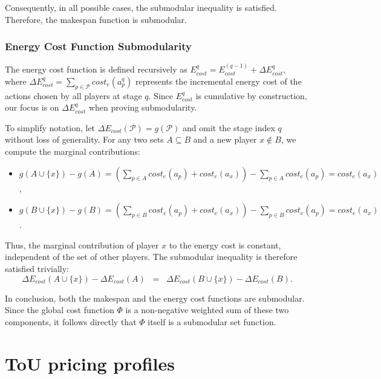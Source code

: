 \documentclass[preprint, 3p, review, 12pt]{elsarticle}
\begin{document}
Consequently, in all possible cases, the submodular inequality is satisfied. Therefore, the makespan function is submodular.

\subsubsection{Energy Cost Function Submodularity}
The energy cost function is defined recursively as $E_{cost}^{q} = E_{cost}^{(q-1)} + \Delta E_{cost}^{q}$, where $\Delta E_{cost}^{q} = \sum_{p \in \mathcal{P}} cost_e(a_p^{q})$ represents the incremental energy cost of the actions chosen by all players at stage $q$. Since $E_{cost}^{q}$ is cumulative by construction, our focus is on $\Delta E_{cost}^{q}$ when proving submodularity.  

To simplify notation, let $\Delta E_{cost}(\mathcal{P}) = g(\mathcal{P})$ and omit the stage index $q$ without loss of generality. For any two sets $A \subseteq B$ and a new player $x \notin B$, we compute the marginal contributions:  
\begin{itemize}
    \item $g(A \cup \{x\}) - g(A) = \left(\sum_{p \in A} cost_e(a_p) + cost_e(a_x)\right) - \sum_{p \in A} cost_e(a_p) = cost_e(a_x)$,
    \item $g(B \cup \{x\}) - g(B) = \left(\sum_{p \in B} cost_e(a_p) + cost_e(a_x)\right) - \sum_{p \in B} cost_e(a_p) = cost_e(a_x)$.
\end{itemize}
Thus, the marginal contribution of player $x$ to the energy cost is constant, independent of the set of other players. The submodular inequality is therefore satisfied trivially:
\[
\Delta E_{cost}(A \cup \{x\}) - \Delta E_{cost}(A) \;\;=\;\; \Delta E_{cost}(B \cup \{x\}) - \Delta E_{cost}(B).
\]

In conclusion, both the makespan and the energy cost functions are submodular. Since the global cost function $\Phi$ is a non-negative weighted sum of these two components, it follows directly that $\Phi$ itself is a submodular set function.

\section{ToU pricing profiles}
\label{app1}
\end{document}
